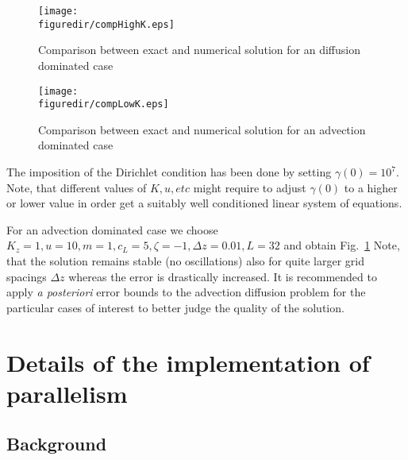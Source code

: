 \documentclass[12pt]{report}
\def\figuredir{./figures}
\begin{document}
\begin{figure}[t]
  \begin{minipage}[c]{0.48\textwidth}
      \texttt{[image: \\figuredir/compHighK.eps]}
    \caption{Comparison between exact and numerical solution for an
      diffusion dominated case}
    \label{test1}
  \end{minipage}
  \hfill
  \begin{minipage}[c]{0.48\textwidth}
      \texttt{[image: \\figuredir/compLowK.eps]}
    \caption{Comparison between exact and numerical solution for an
      advection dominated case}
    \label{test2}
  \end{minipage}
\end{figure}
The imposition of the Dirichlet condition has been done by setting
$\gamma(0)=10^7$. Note, that different values of $K,u,etc$ might
require to adjust $\gamma(0)$ to a higher or lower value in order get
a suitably well conditioned linear system of equations.

For an advection dominated case we choose
$K_z=1,u=10,m=1,c_L=5,\zeta=-1,\Delta z=0.01,L=32$ and obtain Fig.\
\ref{test2} Note, that the solution remains stable (no oscillations)
also for quite larger grid spacings $\Delta z$ whereas the error is
drastically increased. It is recommended to apply {\em a posteriori}
error bounds to the advection diffusion problem for the particular
cases of interest to better judge the quality of the solution.



\section{Details of the implementation of parallelism}

\subsection{Background}
\end{document}
